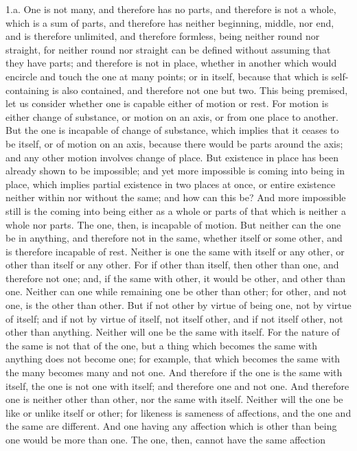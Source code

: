 1.a. One is not many, and therefore has no parts, and therefore is not
a whole, which is a sum of parts, and therefore has neither beginning,
middle, nor end, and is therefore unlimited, and therefore formless,
being neither round nor straight, for neither round nor straight can be
defined without assuming that they have parts; and therefore is not in
place, whether in another which would encircle and touch the one at
many points; or in itself, because that which is self-containing is also
contained, and therefore not one but two. This being premised, let us
consider whether one is capable either of motion or rest. For motion is
either change of substance, or motion on an axis, or from one place to
another. But the one is incapable of change of substance, which implies
that it ceases to be itself, or of motion on an axis, because there
would be parts around the axis; and any other motion involves change of
place. But existence in place has been already shown to be impossible;
and yet more impossible is coming into being in place, which implies
partial existence in two places at once, or entire existence neither
within nor without the same; and how can this be? And more impossible
still is the coming into being either as a whole or parts of that which
is neither a whole nor parts. The one, then, is incapable of motion.
But neither can the one be in anything, and therefore not in the same,
whether itself or some other, and is therefore incapable of rest.
Neither is one the same with itself or any other, or other than itself
or any other. For if other than itself, then other than one, and
therefore not one; and, if the same with other, it would be other, and
other than one. Neither can one while remaining one be other than other;
for other, and not one, is the other than other. But if not other by
virtue of being one, not by virtue of itself; and if not by virtue
of itself, not itself other, and if not itself other, not other than
anything. Neither will one be the same with itself. For the nature of
the same is not that of the one, but a thing which becomes the same with
anything does not become one; for example, that which becomes the same
with the many becomes many and not one. And therefore if the one is the
same with itself, the one is not one with itself; and therefore one and
not one. And therefore one is neither other than other, nor the same
with itself. Neither will the one be like or unlike itself or other;
for likeness is sameness of affections, and the one and the same are
different. And one having any affection which is other than being one
would be more than one. The one, then, cannot have the same affection
